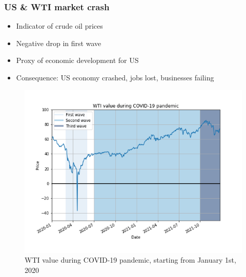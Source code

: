 \documentclass[aspectratio=169,classic]{uva-inf-presentation}
\begin{document}
\begin{frame}
\frametitle{US \& WTI market crash}
\begin{itemize}
    \item Indicator of crude oil prices
    \item Negative drop in first wave
    \item Proxy of economic development for US
    \item Consequence: US economy crashed, jobs lost, businesses failing
\end{itemize}
\begin{figure}\centering
    \includegraphics[trim=0cm 1.5cm 0 -3cm, scale=0.4]{images/covid_19_WTI.png}
    \caption{WTI value during COVID-19 pandemic, starting from January 1st, 2020}
\end{figure}
\end{frame}
\end{document}
